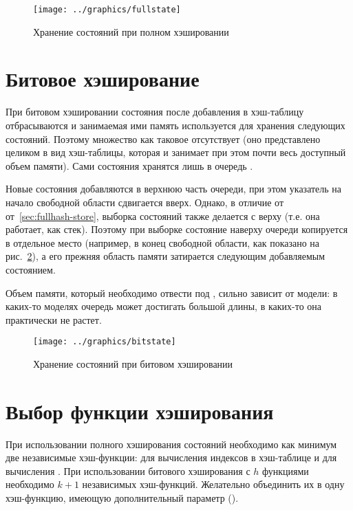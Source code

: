 \begin{figure}[ht]
  \centering
  \texttt{[image: ../graphics/fullstate]}
  \caption{Хранение состояний при полном хэшировании}
  \label{fig:fullstate}
\end{figure}

\section{Битовое хэширование}
\label{sec:bithash-store}

При битовом хэшировании состояния после добавления в хэш-таблицу отбрасываются и
занимаемая ими память используется для хранения следующих состояний. Поэтому множество
 как таковое отсутствует (оно представлено целиком в вид хэш-таблицы,
которая и занимает при этом почти весь доступный объем памяти). Сами состояния хранятся
лишь в очередь .

Новые состояния добавляются в верхнюю часть очереди, при этом указатель на начало
свободной области сдвигается вверх. Однако, в отличие от от~\ref{sec:fullhash-store},
выборка состояний также делается с верху  (т.е. она работает, как
стек). Поэтому при выборке состояние наверху очереди копируется в отдельное место
(например, в конец свободной области, как показано на рис.~\ref{fig:bitstate}), а его
прежняя область памяти затирается следующим добавляемым состоянием.

Объем памяти, который необходимо отвести под , сильно зависит от модели: в
каких-то моделях очередь может достигать большой длины, в каких-то она практически не
растет.

\begin{figure}[ht]
  \centering
  \texttt{[image: ../graphics/bitstate]}  
  \caption{Хранение состояний при битовом хэшировании}
  \label{fig:bitstate}
\end{figure}

\section{Выбор функции хэширования}
\label{sec:hashing-function}

При использовании полного хэширования состояний необходимо как минимум две независимые
хэш-функции: для вычисления индексов в хэш-таблице и для вычисления . При
использовании битового хэширования с $h$ функциями необходимо $k + 1$ независимых
хэш-функций. Желательно объединить их в одну хэш-функцию, имеющую дополнительный параметр
().

